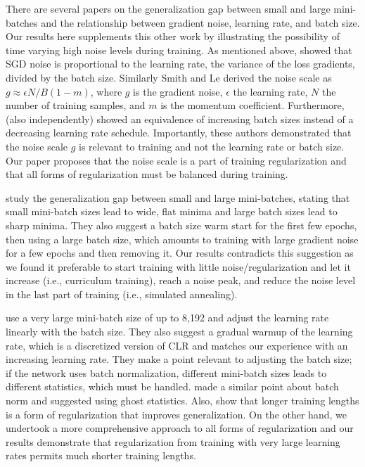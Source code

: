 \documentclass{article}
\begin{document}
	There are several papers on the generalization gap between small and large mini-batches and the relationship between gradient noise, learning rate, and batch size.
	Our results here supplements this other work by illustrating the possibility of time varying high noise levels during training.
	As mentioned above,  \cite{jastrzkebski2017three} showed that SGD noise is proportional to the learning rate, the variance of the loss gradients, divided by the batch size.
	Similarly Smith and Le \citep{smith2017understanding} derived the noise scale as $ g \approx \epsilon N / B (1 - m) $, where $g$ is the gradient noise, $\epsilon$ the learning rate, $N$ the number of training samples, and $m$ is the momentum coefficient.
	Furthermore, \cite{smith2017don} (also \cite{jastrzkebski2017three} independently) showed an equivalence of increasing batch sizes instead of a decreasing learning rate schedule.
	Importantly, these authors demonstrated that the noise scale $g$ is relevant to training and not the learning rate or batch size.
	Our paper proposes that the noise scale is a part of training regularization and that all forms of regularization must be balanced during training.
	
	\cite{keskar2016large} study the generalization gap between small and large mini-batches, stating that small mini-batch sizes lead to wide, flat minima and large batch sizes lead to sharp minima.
	They also suggest a batch size warm start for the first few epochs, then using a large batch size, which amounts to training with large gradient noise for a few epochs and then removing it.
	Our results contradicts this suggestion as we found it preferable to start training with little noise/regularization and let it increase (i.e., curriculum training), reach a noise peak, and reduce the noise level in the last part of training (i.e., simulated annealing). 
	
	\cite{goyal2017accurate} use a very large mini-batch size of up to 8,192 and adjust the learning rate linearly with the batch size.
	They also suggest a gradual warmup of the learning rate, which is a discretized version of CLR and matches our experience with an increasing learning rate.
	They make a point relevant to adjusting the batch size; if the network uses batch normalization, different mini-batch sizes leads to different statistics, which must be handled.
	\cite{hoffer2017train} made a similar point about batch norm and suggested using ghost statistics.
	Also, \cite{hoffer2017train}  show that longer training lengths is a form of regularization that improves generalization.
	On the other hand, we undertook a more comprehensive approach to all forms of regularization and our results demonstrate that regularization from training with very large learning rates permits much shorter training lengths.
	
\end{document}
